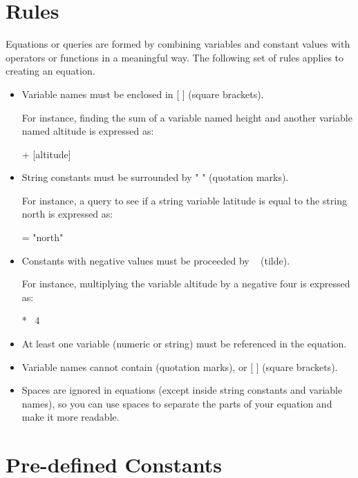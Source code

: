 \section{Rules}

Equations or queries are formed by combining variables and constant
values with operators or functions in a meaningful way. The following
set of rules applies to creating an equation.

\begin{itemize}
\item Variable names must be enclosed in [ ] (square brackets).
  
  For instance, finding the sum of a variable named height and another
  variable named altitude is expressed as:

\begin{example}
[height] + [altitude] 
\end{example}

\item String constants must be surrounded by " " (quotation marks).
  
  For instance, a query to see if a string variable latitude is equal
  to the string north is expressed as:

\begin{example}
[latitude] = "north" 
\end{example}

\item Constants with negative values must be proceeded by ~ (tilde).
  
  For instance, multiplying the variable altitude by a negative four
  is expressed as:

\begin{example}
[altitude] * ~4 
\end{example}

\item At least one variable (numeric or string) must be referenced in
  the equation.
  
\item Variable names cannot contain  (quotation marks), or [ ]
  (square brackets).
  
\item Spaces are ignored in equations (except inside string constants
  and variable names), so you can use spaces to separate the parts of
  your equation and make it more readable.
\end{itemize}

\section{Pre-defined Constants}

